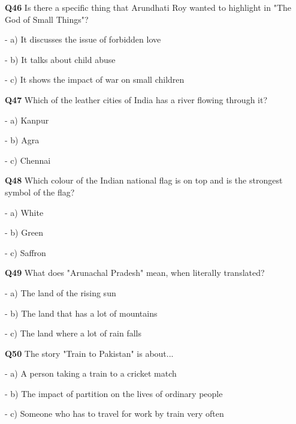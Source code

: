 \textbf{Q46} Is there a specific thing that Arundhati Roy wanted to highlight in "The God of Small Things"?\par
\quad - a) It discusses the issue of forbidden love\par
\quad - b) It talks about child abuse\par
\quad - c) It shows the impact of war on small children\par

\textbf{Q47} Which of the leather cities of India has a river flowing through it?\par
\quad - a) Kanpur\par
\quad - b) Agra\par
\quad - c) Chennai\par

\textbf{Q48} Which colour of the Indian national flag is on top and is the strongest symbol of the flag?\par
\quad - a) White\par
\quad - b) Green\par
\quad - c) Saffron\par

\textbf{Q49} What does "Arunachal Pradesh" mean, when literally translated?\par
\quad - a) The land of the rising sun\par
\quad - b) The land that has a lot of mountains\par
\quad - c) The land where a lot of rain falls\par

\textbf{Q50} The story "Train to Pakistan" is about...\par
\quad - a) A person taking a train to a cricket match\par
\quad - b) The impact of partition on the lives of ordinary people\par
\quad - c) Someone who has to travel for work by train very often\par
